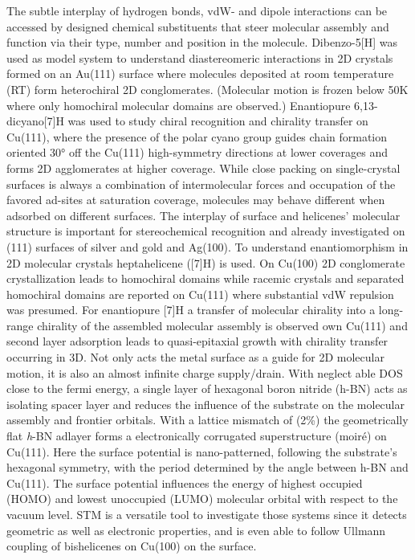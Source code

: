 The subtle interplay of hydrogen bonds, vdW- and dipole interactions can be accessed by designed chemical substituents that steer molecular assembly and function via their type, number and position in the molecule. Dibenzo-5[H] was used as model system to understand diastereomeric interactions in 2D crystals formed on an Au(111) surface where molecules deposited at room temperature (RT) form heterochiral 2D conglomerates.\cite{} (Molecular motion is frozen below 50K where only homochiral molecular domains are observed.) Enantiopure 6,13-dicyano[7]H was used to study chiral recognition and chirality transfer on Cu(111)\cite{}, where the presence of the polar cyano group guides chain formation oriented 30° off the Cu(111) high-symmetry directions at lower coverages and forms 2D agglomerates at higher coverage. While close packing on single-crystal surfaces is always a combination of intermolecular forces and occupation of the favored ad-sites at saturation coverage, molecules may behave different when adsorbed on different surfaces. The interplay of surface and helicenes’ molecular structure is important for stereochemical recognition\cite{} and already investigated on (111) surfaces of silver and gold\cite{} and Ag(100)\cite{}. To understand enantiomorphism in 2D molecular crystals heptahelicene ([7]H) is used.\cite{} On Cu(100) 2D conglomerate crystallization leads to homochiral domains\cite{} while racemic crystals\cite{} and separated homochiral domains\cite{} are reported on Cu(111) where substantial vdW repulsion was presumed. For enantiopure [7]H a transfer of molecular chirality into a long-range chirality of the assembled molecular assembly is observed own Cu(111)\cite{} and second layer adsorption leads to quasi-epitaxial growth with chirality transfer occurring in 3D.\cite{}
Not only acts the metal surface as a guide for 2D molecular motion, it is also an almost infinite charge supply/drain. With neglect able DOS close to the fermi energy, a single layer of hexagonal boron nitride (h-BN) acts as isolating spacer layer and reduces the influence of the substrate on the molecular assembly and frontier orbitals.\cite{} With a lattice mismatch of (2\%)\cite{} the geometrically flat\cite{} \textit{h}-BN adlayer forms a electronically corrugated superstructure (moiré) on Cu(111).\cite{} Here the surface potential is nano-patterned\cite{}, following the substrate’s hexagonal symmetry, with the period determined by the angle between h-BN and Cu(111)\cite{}. The surface potential influences the energy of highest occupied (HOMO) and lowest unoccupied (LUMO) molecular orbital with respect to the vacuum level.\cite{} STM is a versatile tool to investigate those systems since it detects geometric as well as electronic properties, and is even able to follow Ullmann coupling of bishelicenes on Cu(100)\cite{} on the surface. 

